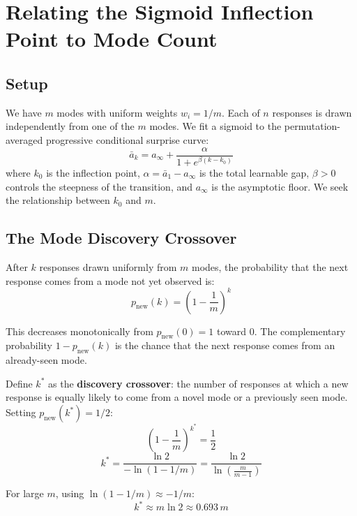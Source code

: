 \documentclass[11pt]{article}
\begin{document}
\section*{Relating the Sigmoid Inflection Point to Mode Count}

\subsection*{Setup}

We have $m$ modes with uniform weights $w_i = 1/m$. Each of $n$ responses is drawn independently from one of the $m$ modes. We fit a sigmoid to the permutation-averaged progressive conditional surprise curve:
\begin{equation}
    \bar{a}_k = a_\infty + \frac{\alpha}{1 + e^{\beta(k - k_0)}}
\end{equation}
where $k_0$ is the inflection point, $\alpha = \bar{a}_1 - a_\infty$ is the total learnable gap, $\beta > 0$ controls the steepness of the transition, and $a_\infty$ is the asymptotic floor. We seek the relationship between $k_0$ and $m$.

\subsection*{The Mode Discovery Crossover}

After $k$ responses drawn uniformly from $m$ modes, the probability that the next response comes from a mode not yet observed is:
\begin{equation}
    p_{\mathrm{new}}(k) = \left(1 - \frac{1}{m}\right)^{k}
\end{equation}

This decreases monotonically from $p_{\mathrm{new}}(0) = 1$ toward 0. The complementary probability $1 - p_{\mathrm{new}}(k)$ is the chance that the next response comes from an already-seen mode.

Define $k^*$ as the \textbf{discovery crossover}: the number of responses at which a new response is equally likely to come from a novel mode or a previously seen mode. Setting $p_{\mathrm{new}}(k^*) = 1/2$:
\begin{equation}
    \left(1 - \frac{1}{m}\right)^{k^*} = \frac{1}{2}
\end{equation}
\begin{equation}
    k^* = \frac{\ln 2}{-\ln(1 - 1/m)} = \frac{\ln 2}{\ln\!\left(\frac{m}{m-1}\right)}
\end{equation}

For large $m$, using $\ln(1 - 1/m) \approx -1/m$:
\begin{equation}\label{eq:kstar}
    k^* \approx m \ln 2 \approx 0.693\, m
\end{equation}
\end{document}
